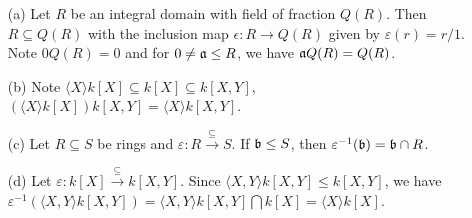\begin{example}
    \begin{enumerate}
        \item[(a)] Let $R$ be an integral domain with field of fraction $Q(R)$. Then $R \subseteq Q(R)$ with the inclusion map $\epsilon:R \to Q(R)$ given by $\varepsilon(r) = r/1$. Note $0Q(R) = 0$ and for $0 \neq \mathfrak{a} \leq R$, we have $\mathfrak{a} Q(R) = Q(R)$.
        \item[(b)] Note $\langle X\rangle k[X] \subseteq k[X] \subseteq k[X,Y]$, $\left(\langle X \rangle k[X]\right)k[X,Y] = \langle X \rangle k[X,Y]$.
        \item[(c)] Let $R \subseteq S$ be rings and $\varepsilon: R \xrightarrow \subseteq S$. If $\mathfrak{b} \leq S$, then $\varepsilon^{-1}(\mathfrak{b}) = \mathfrak{b} \cap R$.
        \item[(d)] Let $\varepsilon : k[X] \xrightarrow{\subseteq} k[X,Y]$. Since $\langle X,Y \rangle k[X,Y] \leq k[X,Y]$, we have $\varepsilon^{-1}(\langle X,Y \rangle k[X,Y]) = \langle X,Y \rangle k[X,Y] \textstyle \bigcap k[X] = \langle X \rangle k[X]$.
    \end{enumerate}
\end{example}

